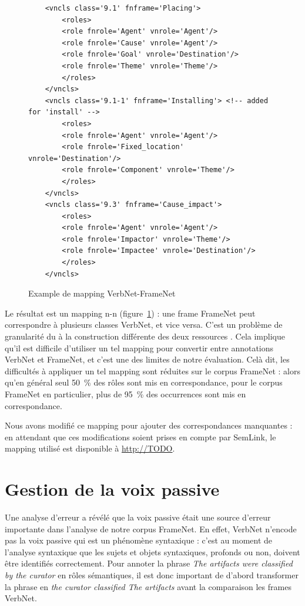 \begin{figure}[ht]
    \begin{verbatim}
    <vncls class='9.1' fnframe='Placing'>
        <roles>
        <role fnrole='Agent' vnrole='Agent'/>
        <role fnrole='Cause' vnrole='Agent'/>
        <role fnrole='Goal' vnrole='Destination'/>
        <role fnrole='Theme' vnrole='Theme'/>
        </roles>
    </vncls>
    <vncls class='9.1-1' fnframe='Installing'> <!-- added for 'install' -->
        <roles>
        <role fnrole='Agent' vnrole='Agent'/>
        <role fnrole='Fixed_location' vnrole='Destination'/>
        <role fnrole='Component' vnrole='Theme'/>
        </roles>
    </vncls>
    <vncls class='9.3' fnframe='Cause_impact'>
        <roles>
        <role fnrole='Agent' vnrole='Agent'/>
        <role fnrole='Impactor' vnrole='Theme'/>
        <role fnrole='Impactee' vnrole='Destination'/>
        </roles>
    </vncls>
    \end{verbatim}
    \caption{\label{fig:mapping}Example de mapping VerbNet-FrameNet}
\end{figure}

Le résultat est un mapping n-n (figure~\ref{fig:mapping}) : une frame FrameNet
peut correspondre à plusieurs classes VerbNet, et vice versa. C'est un problème
de granularité du à la construction différente des deux ressources
\citep{palmer2009semlink}. Cela implique qu'il est difficile d'utiliser un tel
mapping pour convertir entre annotations VerbNet et FrameNet, et c'est une des
limites de notre évaluation.  Celà dit, les difficultés à appliquer un tel
mapping sont réduites sur le corpus FrameNet : alors qu'en général seul 50~\%
des rôles sont mis en correspondance, pour le corpus FrameNet en particulier,
plus de 95~\% des occurrences sont mis en correspondance.

Nous avons modifié ce mapping pour ajouter des correspondances manquantes : en
attendant que ces modifications soient prises en compte par SemLink, le mapping
utilisé est disponible à \url{http://TODO}. %

\section{Gestion de la voix passive}
\label{sec:passif}

Une analyse d'erreur a révélé que la voix passive était une source d'erreur
importante dans l'analyse de notre corpus FrameNet. En effet, VerbNet n'encode
pas la voix passive qui est un phénomène syntaxique : c'est au moment de
l'analyse syntaxique que les sujets et objets syntaxiques, profonds ou non,
doivent être identifiés correctement. Pour annoter la phrase \emph{The
artifacts were classified by the curator} en rôles sémantiques, il est donc
important de d'abord transformer la phrase en \emph{the curator classified The
artifacts} avant la comparaison les frames VerbNet.

